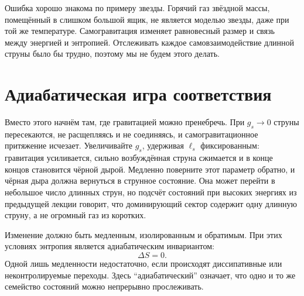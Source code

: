 Ошибка хорошо знакома по примеру звезды. Горячий газ звёздной массы, помещённый в слишком большой ящик, не является моделью звезды, даже при той же температуре. Самогравитация изменяет равновесный размер и связь между энергией и энтропией. Отслеживать каждое самовзаимодействие длинной струны было бы трудно, поэтому мы не будем этого делать.

\begin{classroomqa}
\end{classroomqa}

\section{Адиабатическая игра соответствия}

Вместо этого начнём там, где гравитацией можно пренебречь. При \(g_s\to0\) струны пересекаются, не расщепляясь и не соединяясь, и самогравитационное притяжение исчезает. Увеличивайте \(g_s\), удерживая \(\ell_s\) фиксированным: гравитация усиливается, сильно возбуждённая струна сжимается и в конце концов становится чёрной дырой. Медленно поверните этот параметр обратно, и чёрная дыра должна вернуться в струнное состояние. Она может перейти в небольшое число длинных струн, но подсчёт состояний при высоких энергиях из предыдущей лекции говорит, что доминирующий сектор содержит одну длинную струну, а не огромный газ из коротких.

\begin{classroomqa}
\end{classroomqa}

Изменение должно быть медленным, изолированным и обратимым. При этих условиях энтропия является адиабатическим инвариантом:
\begin{equation}
\Delta S=0.
\label{eq:l07-adiabatic}
\end{equation}
Одной лишь медленности недостаточно, если происходят диссипативные или неконтролируемые переходы. Здесь ``адиабатический'' означает, что одно и то же семейство состояний можно непрерывно прослеживать.

